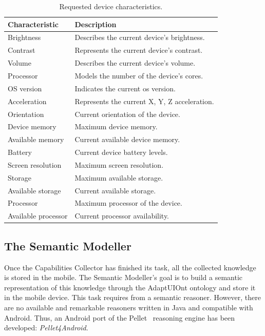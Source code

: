 \begin{table}[H]
  \caption{Requested device characteristics.}
 \label{tbl:device_characteristics}
\footnotesize
\centering
 \begin{tabular}{l l}
  \hline 
  \textbf{Characteristic}& \textbf{Description}				\\
  \hline
  Brightness		& Describes the current device’s brightness.	\\
  Contrast		& Represents the current device’s contrast.	\\
  Volume		& Describes the current device’s volume.	\\
  Processor		& Models the number of the device’s cores.	\\
  OS version		& Indicates the current	\ac{os} version.	\\
  Acceleration		& Represents the current X, Y, Z acceleration.	\\
  Orientation		& Current orientation of the device.		\\
  Device memory		& Maximum device memory.			\\
  Available memory	& Current available device memory.		\\
  Battery		& Current device battery levels.		\\
  Screen resolution	& Maximum screen resolution.			\\
  Storage		& Maximum available storage.			\\
  Available storage	& Current available storage.			\\
  Processor		& Maximum processor of the device.		\\
  Available processor	& Current processor availability.		\\
  \hline
\end{tabular}
\end{table}


\subsection{The Semantic Modeller}
\label{sec:semantic_modeller}

Once the Capabilities Collector has finished its task, all the collected
knowledge is stored in the mobile. The Semantic Modeller's goal is to build a 
semantic representation of this knowledge through the AdaptUIOnt ontology and
store it in the mobile device. This task requires from a semantic reasoner. 
However, there are no available and remarkable reasoners written in Java and 
compatible with Android. Thus, an Android port of the 
Pellet~\citep{pellet} reasoning engine has been developed: \textit{Pellet4Android}.

